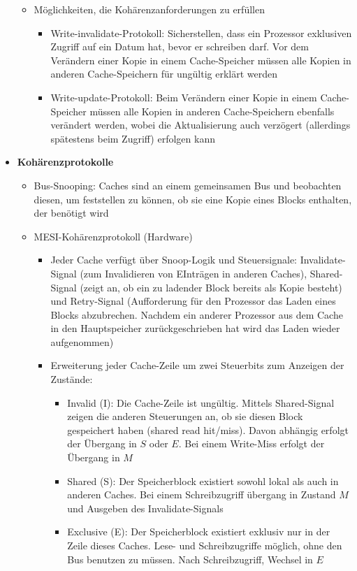 \begin{itemize}
\begin{itemize}
		\item Möglichkeiten, die Kohärenzanforderungen zu erfüllen
		\begin{itemize}
			\item Write-invalidate-Protokoll: Sicherstellen, dass ein Prozessor exklusiven Zugriff auf ein Datum hat, bevor er schreiben darf. Vor dem Verändern einer Kopie in einem Cache-Speicher müssen alle Kopien in anderen Cache-Speichern für ungültig erklärt werden
			\item Write-update-Protokoll: Beim Verändern einer Kopie in einem Cache-Speicher müssen alle Kopien in anderen Cache-Speichern ebenfalls verändert werden, wobei die Aktualisierung auch verzögert (allerdings spätestens beim Zugriff) erfolgen kann
		\end{itemize}
	\end{itemize}
	\item \textbf{Kohärenzprotokolle}
	\begin{itemize}
		\item Bus-Snooping: Caches sind an einem gemeinsamen Bus und beobachten diesen, um feststellen zu können, ob sie eine Kopie eines Blocks enthalten, der benötigt wird
		\item MESI-Kohärenzprotokoll (Hardware)
		\begin{itemize}
			\item Jeder Cache verfügt über Snoop-Logik und Steuersignale: Invalidate-Signal (zum Invalidieren von EInträgen in anderen Caches), Shared-Signal (zeigt an, ob ein zu ladender Block bereits als Kopie besteht) und Retry-Signal (Aufforderung für den Prozessor das Laden eines Blocks abzubrechen. Nachdem ein anderer Prozessor aus dem Cache in den Hauptspeicher zurückgeschrieben hat wird das Laden wieder aufgenommen)
			\item Erweiterung jeder Cache-Zeile um zwei Steuerbits zum Anzeigen der Zustände:
			\begin{itemize}
				\item Invalid (I): Die Cache-Zeile ist ungültig. Mittels Shared-Signal zeigen die anderen Steuerungen an, ob sie diesen Block gespeichert haben (shared read hit/miss). Davon abhängig erfolgt der Übergang in \(S\) oder \(E\). Bei einem Write-Miss erfolgt der Übergang in \(M\)
				\item Shared (S): Der Speicherblock existiert sowohl lokal als auch in anderen Caches. Bei einem Schreibzugriff übergang in Zustand \(M\) und Ausgeben des Invalidate-Signals
				\item Exclusive (E): Der Speicherblock existiert exklusiv nur in der Zeile dieses Caches. Lese- und Schreibzugriffe möglich, ohne den Bus benutzen zu müssen. Nach Schreibzugriff, Wechsel in \(E\)

\end{itemize}
\end{itemize}
\end{itemize}
\end{itemize}
